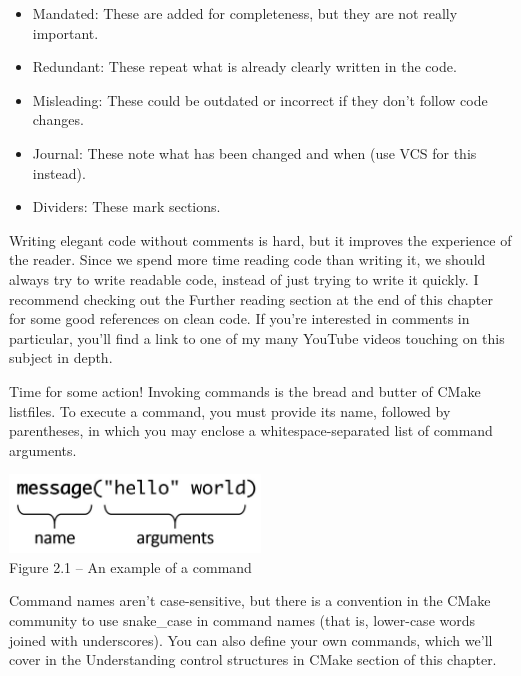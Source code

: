 \begin{itemize}
\item 
Mandated: These are added for completeness, but they are not really important.

\item 
Redundant: These repeat what is already clearly written in the code.

\item 
Misleading: These could be outdated or incorrect if they don't follow code changes.

\item 
Journal: These note what has been changed and when (use VCS for this instead).

\item 
Dividers: These mark sections.
\end{itemize}

Writing elegant code without comments is hard, but it improves the experience of the reader. Since we spend more time reading code than writing it, we should always try to write readable code, instead of just trying to write it quickly. I recommend checking out the Further reading section at the end of this chapter for some good references on clean code. If you're interested in comments in particular, you'll find a link to one of my many YouTube videos touching on this subject in depth.



Time for some action! Invoking commands is the bread and butter of CMake listfiles. To execute a command, you must provide its name, followed by parentheses, in which you may enclose a whitespace-separated list of command arguments.

\begin{center}
\includegraphics[width=0.5\textwidth]{content/1/chapter2/images/1.jpg}\\
Figure 2.1 – An example of a command
\end{center}

Command names aren't case-sensitive, but there is a convention in the CMake community to use snake\_case in command names (that is, lower-case words joined with underscores).
You can also define your own commands, which we'll cover in the Understanding control structures in CMake section of this chapter.

